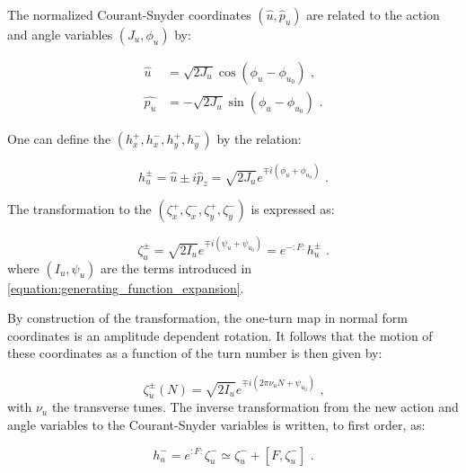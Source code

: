 The normalized Courant-Snyder coordinates \(\left( \hat{u}, \hat{p}_u \right)\) are related to the action and angle variables \(\left( J_u, \phi_u \right)\) by:

\begin{equation}
    \begin{aligned}
        \hat{u}   &= \sqrt{2 J_u} \cos \left( \phi_u - \phi_{u_0} \right) \text{ ,} \\
        \hat{p_u} &= - \sqrt{2 J_u} \sin \left( \phi_u - \phi_{u_0} \right) \text{ .}
    \end{aligned}
    \label{equation:normalized_courant_snyder_coordinates_from_action_angle}
\end{equation}

One can define the  \(\left( h_x^{+}, h_x^{-}, h_y^{+}, h_y^{-} \right)\) by the relation:

\begin{equation}
    h_u^{\pm} = \hat{u} \pm i \hat{p}_z = \sqrt{2 J_u} e^{\mp i \left( \phi_u + \phi_{u_0} \right)} \text{ .}
    \label{equation:resonance_basis_definition}
\end{equation}

The transformation to the  \(\left( \zeta_x^{+}, \zeta_x^{-}, \zeta_y^{+}, \zeta_y^{-} \right)\) is expressed as:

\begin{equation}
    \zeta_u^{\pm} = \sqrt{2 I_u} e^{\mp i \left( \psi_u + \psi_{u_0} \right)} = e^{-:F:} h_u^{\pm} \text{ .}
    \label{equation:transformation_to_normal_form_coordinates_from_h_pm}
\end{equation}
where \((I_u, \psi_u)\) are the terms introduced in \cref{equation:generating_function_expansion}.

By construction of the transformation, the one-turn map in normal form coordinates is an amplitude dependent rotation.
It follows that the motion of these coordinates as a function of the turn number is then given by:

\begin{equation}
    \zeta_u^{\pm}(N) = \sqrt{2 I_u} e^{\mp i \left( 2 \pi \nu_u N + \psi_{u_0} \right)} \text{ ,}
    \label{equation:normal_form_N_turn_expression}
\end{equation}
with \(\nu_u\) the transverse tunes.
The inverse transformation from the new action and angle variables to the Courant-Snyder variables is written, to first order, as:

\begin{equation}
    h_u^{-} = e^{:F:} \zeta_u^{-} \simeq \zeta_u^{-} + \left[ F, \zeta_u^{-} \right] \text{ .}
    \label{equation:inverse_transformation_normal_form-to_courant_snyder_coordinates}
\end{equation}

